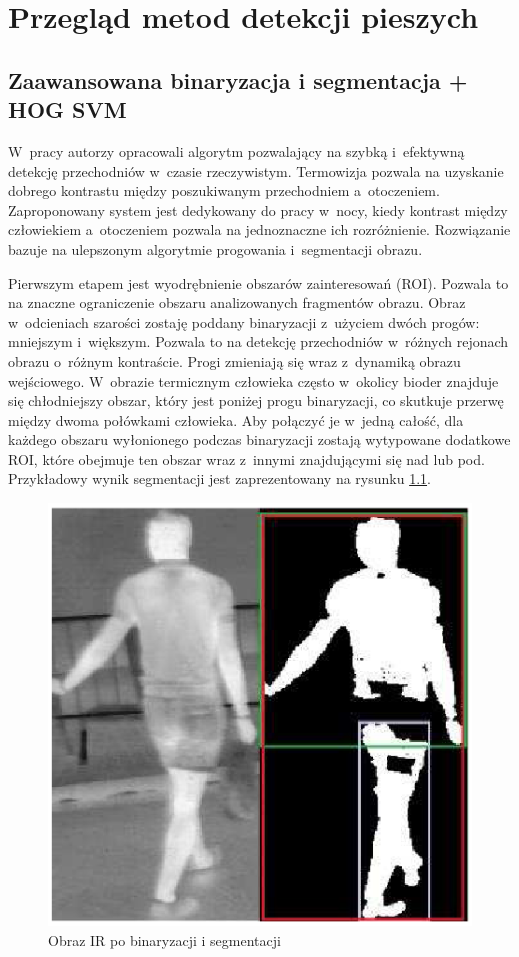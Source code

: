 \chapter{Przegląd metod detekcji pieszych}
\label{cha:przegLiter}

\section{Zaawansowana binaryzacja i segmentacja + HOG SVM} %
W~pracy \cite{kolzpoz} autorzy opracowali algorytm pozwalający na szybką i~efektywną detekcję przechodniów w~czasie rzeczywistym.
Termowizja pozwala na uzyskanie dobrego kontrastu między poszukiwanym przechodniem a~otoczeniem.
Zaproponowany system jest dedykowany do pracy w~nocy, kiedy kontrast między człowiekiem a~otoczeniem pozwala na jednoznaczne ich rozróżnienie. 
Rozwiązanie bazuje na ulepszonym algorytmie progowania i~segmentacji obrazu.

Pierwszym etapem jest wyodrębnienie obszarów zainteresowań (ROI).
Pozwala to na znaczne ograniczenie obszaru analizowanych fragmentów obrazu. 
Obraz w~odcieniach szarości zostaję poddany binaryzacji z~użyciem dwóch progów: mniejszym i~większym. 
Pozwala to na detekcję przechodniów w~różnych rejonach obrazu o~różnym kontraście.
Progi zmieniają się wraz z~dynamiką obrazu wejściowego.
W~obrazie termicznym człowieka często w~okolicy bioder znajduje się chłodniejszy obszar, który jest poniżej progu binaryzacji, co skutkuje przerwę między dwoma połówkami człowieka. 
Aby połączyć je w~jedną całość, dla każdego obszaru wyłonionego podczas binaryzacji zostają wytypowane dodatkowe ROI, które obejmuje ten obszar wraz z~innymi znajdującymi się nad lub pod. 
Przykładowy wynik segmentacji jest zaprezentowany na rysunku \ref{fig:S_IR}.

\begin{figure}
\centering
\includegraphics[width=0.4\linewidth]{images/S_IR}
\caption[Obraz IR po binaryzacji i segmentacji.]{Obraz IR po binaryzacji i segmentacji \cite{kolzpoz}}
\label{fig:S_IR}
\end{figure}

